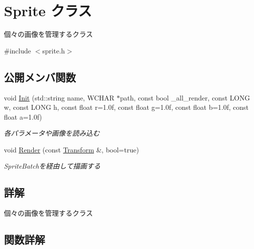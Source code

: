 \hypertarget{class_sprite}{}\section{Sprite クラス}
\label{class_sprite}


個々の画像を管理するクラス  




{\ttfamily \#include $<$sprite.\+h$>$}

\subsection*{公開メンバ関数}
\begin{DoxyCompactItemize}
\item 
void \mbox{\hyperlink{class_sprite_a6d108b11013eeca94c6f283af96a9c9f}{Init}} (std\+::string name, W\+C\+H\+AR $\ast$path, const bool \+\_\+all\+\_\+render, const L\+O\+NG w, const L\+O\+NG h, const float r=1.\+0f, const float g=1.\+0f, const float b=1.\+0f, const float a=1.\+0f)
\begin{DoxyCompactList}\small\item\em 各パラメータや画像を読み込む \end{DoxyCompactList}\item 
void \mbox{\hyperlink{class_sprite_a936771e0b67adc2f673ac24b03411535}{Render}} (const \mbox{\hyperlink{class_transform}{Transform}} \&, bool=true)
\begin{DoxyCompactList}\small\item\em Sprite\+Batchを経由して描画する \end{DoxyCompactList}\end{DoxyCompactItemize}


\subsection{詳解}
個々の画像を管理するクラス 

\subsection{関数詳解}
\mbox{\label{class_sprite_a6d108b11013eeca94c6f283af96a9c9f}} 
